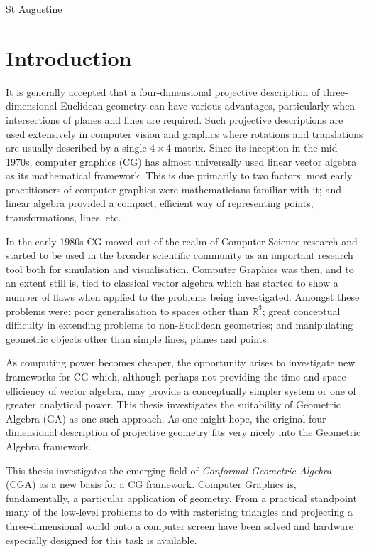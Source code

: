 \begin{savequote}
%
{St Augustine}
\end{savequote}

\chapter{Introduction}
\label{chap:realinto}

It is generally accepted that a four-dimensional projective description of
three-dimensional Euclidean geometry can have various advantages, particularly
when intersections of planes and lines are required. Such projective
descriptions are used extensively in computer vision and graphics where
rotations and translations are usually described by a single $4\times 4$
matrix. Since its inception in the mid-1970s, computer graphics (CG) has
almost universally used linear vector algebra as its mathematical framework.
This is due primarily to two factors: most early practitioners of computer
graphics were mathematicians familiar with it; and linear algebra provided a
compact, efficient way of representing points, transformations, lines, etc.

In the early 1980s CG moved out of the realm of Computer Science research and
started to be used in the broader scientific community as an important
research tool both for simulation and visualisation.  Computer Graphics was
then, and to an extent still is, tied to classical vector algebra which has
started to show a number of flaws when applied to the problems being
investigated. Amongst these problems were: poor generalisation to spaces other
than $\mathbb{R}^3$; great conceptual difficulty in extending problems to
non-Euclidean geometries; and manipulating geometric objects other than simple
lines, planes and points.

As computing power becomes cheaper, the opportunity arises to investigate new
frameworks for CG which, although perhaps not providing the time and space
efficiency of vector algebra, may provide a conceptually simpler system or one
of greater analytical power. This thesis investigates the suitability of
Geometric Algebra (GA) as one such approach. As one might hope, the original
four-dimensional description of projective geometry fits very nicely into the
Geometric Algebra framework\cite{HZ91,IJPR00}. 

This thesis investigates the emerging field of \emph{Conformal Geometric Algebra} (CGA)
as a new basis for a CG framework. Computer Graphics is, fundamentally, a particular
application of geometry. From a practical standpoint many of the low-level problems
to do with rasterising triangles and projecting a three-dimensional world onto
a computer screen have been solved and hardware especially designed for this task
is available.


